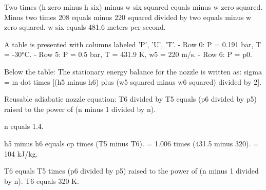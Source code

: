 Two times (h zero minus h six) minus w six squared equals minus w zero squared.  
Minus two times 208 equals minus 220 squared divided by two equals minus w zero squared.  
w six equals 481.6 meters per second.

A table is presented with columns labeled 'P', 'U', 'T'.  
- Row 0: P = 0.191 bar, T = -30°C.  
- Row 5: P = 0.5 bar, T = 431.9 K, w5 = 220 m/s.  
- Row 6: P = p0.  

Below the table:  
The stationary energy balance for the nozzle is written as:  
sigma = m dot times [(h5 minus h6) plus (w5 squared minus w6 squared) divided by 2].  

Reusable adiabatic nozzle equation:  
T6 divided by T5 equals (p6 divided by p5) raised to the power of (n minus 1 divided by n).  

n equals 1.4.  

h5 minus h6 equals cp times (T5 minus T6).  
= 1.006 times (431.5 minus 320).  
= 104 kJ/kg.  

T6 equals T5 times (p6 divided by p5) raised to the power of (n minus 1 divided by n).  
T6 equals 320 K.